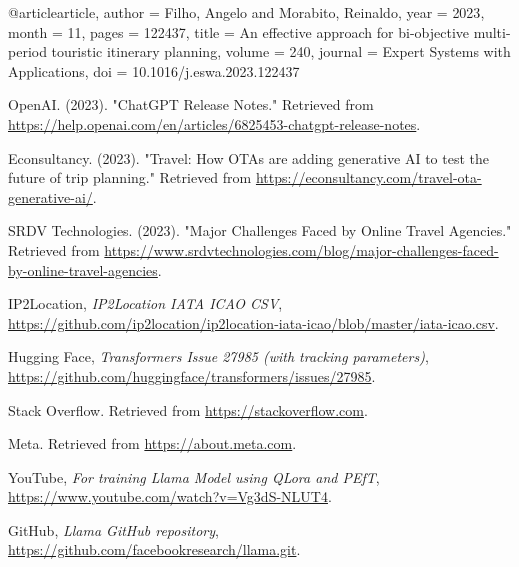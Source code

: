 \documentclass[conference]{IEEEtran}
\begin{document}

\begin{thebibliography}{1}

        @article{article,
        author = {Filho, Angelo and Morabito, Reinaldo},
        year = {2023},
        month = {11},
        pages = {122437},
        title = {An effective approach for bi-objective multi-period touristic itinerary planning},
        volume = {240},
        journal = {Expert Systems with Applications},
        doi = {10.1016/j.eswa.2023.122437}
        }

        OpenAI. (2023). "ChatGPT Release Notes." Retrieved from \url{https://help.openai.com/en/articles/6825453-chatgpt-release-notes}.

        Econsultancy. (2023). "Travel: How OTAs are adding generative AI to test the future of trip planning." Retrieved from \url{https://econsultancy.com/travel-ota-generative-ai/}.

        SRDV Technologies. (2023). "Major Challenges Faced by Online Travel Agencies." Retrieved from \url{https://www.srdvtechnologies.com/blog/major-challenges-faced-by-online-travel-agencies}.

        IP2Location, \emph{IP2Location IATA ICAO CSV}, \href{https://github.com/ip2location/ip2location-iata-icao/blob/master/iata-icao.csv}{https://github.com/ip2location/ip2location-iata-icao/blob/master/iata-icao.csv}.

        Hugging Face, \emph{Transformers Issue 27985 (with tracking parameters)}, \href{https://github.com/huggingface/transformers/issues/27985}{https://github.com/huggingface/transformers/issues/27985}.

        Stack Overflow. Retrieved from \url{https://stackoverflow.com}.

        Meta. Retrieved from \url{https://about.meta.com}.

        YouTube, \emph{For training Llama Model using QLora and PEfT}, \href{https://www.youtube.com/watch?v=Vg3dS-NLUT4}{https://www.youtube.com/watch?v=Vg3dS-NLUT4}.

        GitHub, \emph{Llama GitHub repository}, \href{https://github.com/facebookresearch/llama.git}{https://github.com/facebookresearch/llama.git}.


\end{thebibliography}
\end{document}
